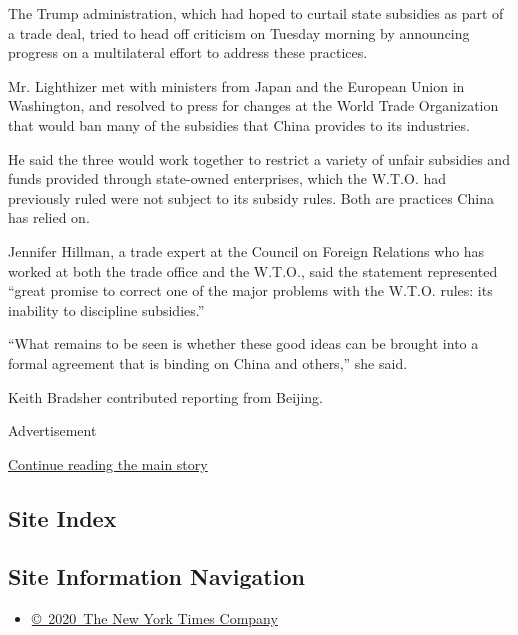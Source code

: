 The Trump administration, which had hoped to curtail state subsidies as
part of a trade deal, tried to head off criticism on Tuesday morning by
announcing progress on a multilateral effort to address these practices.

Mr. Lighthizer met with ministers from Japan and the European Union in
Washington, and resolved to press for changes at the World Trade
Organization that would ban many of the subsidies that China provides to
its industries.

He said the three would work together to restrict a variety of unfair
subsidies and funds provided through state-owned enterprises, which the
W.T.O. had previously ruled were not subject to its subsidy rules. Both
are practices China has relied on.

Jennifer Hillman, a trade expert at the Council on Foreign Relations who
has worked at both the trade office and the W.T.O., said the statement
represented ``great promise to correct one of the major problems with
the W.T.O. rules: its inability to discipline subsidies.''

``What remains to be seen is whether these good ideas can be brought
into a formal agreement that is binding on China and others,'' she said.

Keith Bradsher contributed reporting from Beijing.

Advertisement

\protect\hyperlink{after-bottom}{Continue reading the main story}

\hypertarget{site-index}{%
\subsection{Site Index}\label{site-index}}

\hypertarget{site-information-navigation}{%
\subsection{Site Information
Navigation}\label{site-information-navigation}}

\begin{itemize}
\tightlist
\item
  \href{https://help.nytimes3xbfgragh.onion/hc/en-us/articles/115014792127-Copyright-notice}{©~2020~The
  New York Times Company}
\end{itemize}


